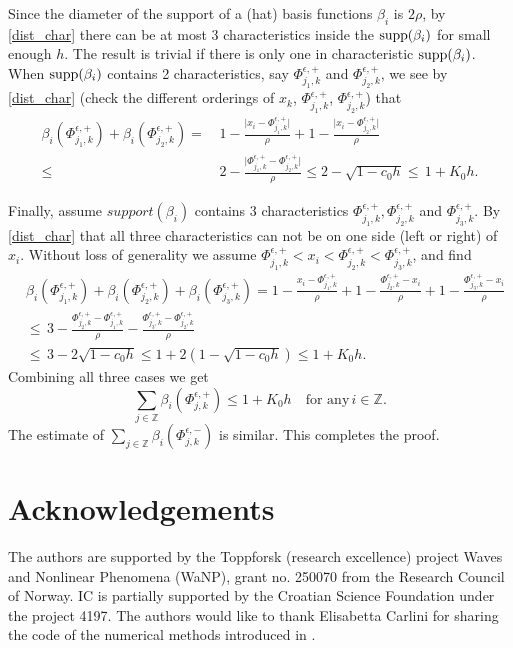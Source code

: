 \documentclass[a4paper,  twoside, 10pt, leqno]{amsart}
\newcommand{\Z}{\mathbb{Z}}
\theoremstyle{remark}
\theoremstyle{definition}
\begin{document}
Since the diameter of the support of a (hat) basis functions $\beta_i$ is $2\rho$, by \eqref{dist_char} there can be at most 3 characteristics inside the $\textup{supp}(\beta_i)$ %
for small enough $h$. The result is trivial if there is only one in characteristic $\textup{supp}(\beta_i)$. 
When  $\textup{supp}(\beta_i)$ contains 2 characteristics, say $\Phi^{\epsilon,+}_{j_1,k}$ and $\Phi^{\epsilon,+}_{j_2,k}$,  we see by \eqref{dist_char} (check the different orderings of $x_k$, $\Phi^{\epsilon,+}_{j_1,k}$, $\Phi^{\epsilon,+}_{j_2,k}$) that
\begin{align*}
\beta_i(\Phi^{\epsilon,+}_{j_1,k})+ \beta_i(\Phi^{\epsilon,+}_{j_2,k}) = &\,  1-\frac{\Big|x_i-\Phi^{\epsilon,+}_{j_1,k}\Big|}{\rho} + 1 -\frac{\Big|x_i-\Phi^{\epsilon,+}_{j_2,k}\Big|}{\rho} \\
 \leq & \, 2 - \frac{\Big|\Phi^{\epsilon,+}_{j_1,k}-\Phi^{\epsilon,+}_{j_2,k}\Big|}{\rho} \leq 2 - \sqrt{1-c_0h} \leq \, 1+ K_0 h. 
\end{align*}

 Finally, assume $support(\beta_i)$ contains 3 characteristics $\Phi^{\epsilon,+}_{j_1,k}, \Phi^{\epsilon,+}_{j_2,k}$ and $\Phi^{\epsilon,+}_{j_3,k}$. By \eqref{dist_char} that all three characteristics can not be on one side (left or right) of $x_i$. Without loss of generality we assume $\Phi^{\epsilon,+}_{j_1,k}<x_i< \Phi^{\epsilon,+}_{j_2,k}<\Phi^{\epsilon,+}_{j_3,k}$, and find 
\begin{align*}
& \beta_i(\Phi^{\epsilon,+}_{j_1,k}) + \beta_i(\Phi^{\epsilon,+}_{j_2,k})+ \beta_i(\Phi^{\epsilon,+}_{j_3,k}) =  1 -\frac{x_i-\Phi^{\epsilon,+}_{j_1,k}}{\rho}+  1 -\frac{\Phi^{\epsilon,+}_{j_2,k}-x_i}{\rho} +  1 -\frac{\Phi^{\epsilon,+}_{j_3,k}-x_i}{\rho} \\
& \leq  \, 3 - \frac{\Phi^{\epsilon,+}_{j_2,k}-\Phi^{\epsilon,+}_{j_1,k}}{\rho} -\frac{\Phi^{\epsilon,+}_{j_3,k}-\Phi^{\epsilon,+}_{j_2,k}}{\rho} \\
& \leq \, 3 - 2 \sqrt{1-c_0h} \leq 1 + 2(1- \sqrt{1-c_0h}) \leq 1+ K_0h.
\end{align*} 
 Combining all three cases we get 
 $$\sum_{j\in \Z} \beta_i (\Phi^{\epsilon,+}_{j,k}) \leq 1 + K_0 h \quad \mbox{for any} \, i \in \Z.$$ 
The estimate of $\sum_{j\in \Z} \beta_i (\Phi^{\epsilon,-}_{j,k})$  is similar. This completes the proof.


\section*{Acknowledgements}
The authors are supported by the Toppforsk (research excellence) project Waves and Nonlinear Phenomena (WaNP), grant no. 250070 from the Research Council of Norway. IC is partially supported by the Croatian Science Foundation under the project 4197. The authors would like to thank Elisabetta Carlini for sharing the code of the numerical methods introduced in \cite{carliniSilva2014semi1st}.
\end{document}
